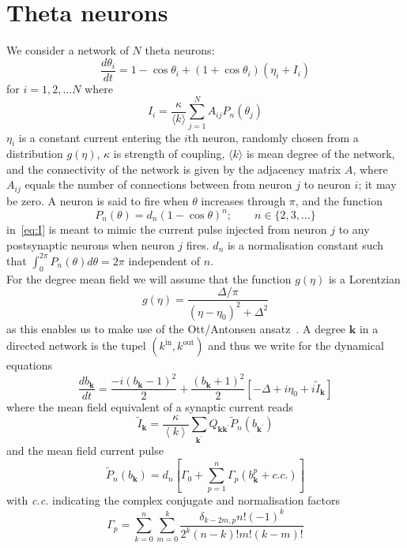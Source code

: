 \documentclass[bibliography=totoc, twoside]{article}
\numberwithin{equation}{section}
\newcommand{\inn}{\text{in}}
\newcommand{\out}{\text{out}}
\newcommand{\mean}[1]{\left< #1 \right>}
\newcommand{\mk}{\langle k\rangle}
\newcommand{\bk}{{\bm k}}
\newcommand{\be}{\begin{equation}}
\newcommand{\ee}{\end{equation}}
\begin{document}
\section{Theta neurons}
We consider a network of $N$ theta neurons:
\be
   \frac{d\theta_i}{dt}=1-\cos{\theta_i}+(1+\cos{\theta_i})(\eta_i+I_i) \label{eq:dthetadt}
\ee
for $i=1,2,\dots N$ where
\be
   I_i=\frac{\kappa}{\mk}\sum_{j=1}^NA_{ij}P_n(\theta_j) \label{eq:I}
\ee
$\eta_i$ is a constant current entering the $i$th neuron, randomly chosen from a distribution
$g(\eta)$, $\kappa$ is strength of coupling,
$\mk$ is mean degree of the network, and the connectivity of the network is given by
the adjacency matrix $A$, where
$A_{ij}$ equals the number of connections between from neuron $j$ to neuron $i$; it may be zero.
A neuron is said to fire when $\theta$
increases through $\pi$, and the function
\be
   P_n(\theta)=d_n(1-\cos{\theta})^n; \qquad n\in\{2,3,\dots\} \label{eq:pq}
\ee
 in~\eqref{eq:I} is meant to mimic the current pulse injected from neuron $j$ to any postsynaptic neurons when
neuron $j$ fires. $d_n$ is a normalisation constant such that $\int_0^{2\pi}P_n(\theta)d\theta=2\pi$
independent of $n$.
\\
For the degree mean field we will assume that the function $g(\eta)$ is a Lorentzian
\be
   g(\eta)=\frac{\Delta/\pi}{(\eta-\eta_0)^2+\Delta^2}
\ee
as this enables us to make use of the Ott/Antonsen ansatz~\cite{ott2008low}.
A degree $\bk$ in a directed network is the tupel $(k^\inn, k^\out)$ and thus we write for the dynamical equations
\be
  \frac{db_\bk}{dt}=\frac{-i(b_\bk-1)^2}{2}+\frac{(b_\bk+1)^2}{2}\left[-\Delta+i\eta_0+i \tilde{I}_\bk\right] \label{eq:b_dbdt}
\ee
where the mean field equivalent of a synaptic current reads
\be
    \tilde{I}_\bk=\frac{\kappa}{\mean{k}}\sum_{\bk^\prime} Q_{\bk \bk^\prime} \tilde{P}_n(b_{\bk^\prime})  \label{eq:Jb}
\ee
and the mean field current pulse
\be
   \tilde{P}_n(b_\bk)=d_n\left[\Gamma_0+\sum_{p=1}^n \Gamma_p(b_\bk^p+c.c.)\right]
\ee
with \textit{c.c.} indicating the complex conjugate and normalisation factors
\be
   \Gamma_p=\sum_{k=0}^n\sum_{m=0}^k\frac{\delta_{k-2m,p}n!(-1)^k}{2^k(n-k)!m!(k-m)!}
\ee
\end{document}
